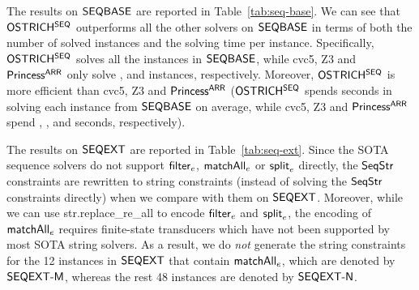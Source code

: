 The results on ${\sf SEQBASE}$ are reported in Table~\ref{tab:seq-base}.
We can see that ${\sf OSTRICH^{SEQ}}$ outperforms all the other solvers on ${\sf SEQBASE}$ in terms of both the number of solved instances and the solving time per instance. Specifically,   ${\sf OSTRICH^{SEQ}}$ solves all the  instances in ${\sf SEQBASE}$, while cvc5, Z3 and ${\sf Princess^{ARR}}$ only solve ,  and  instances, respectively. Moreover,  ${\sf OSTRICH^{SEQ}}$ is more efficient than cvc5, Z3 and ${\sf Princess^{ARR}}$ (${\sf OSTRICH^{SEQ}}$ spends  seconds in solving each instance from ${\sf SEQBASE}$ on average, while cvc5, Z3 and ${\sf Princess^{ARR}}$ spend , , and  seconds, respectively). 



The results on ${\sf SEQEXT}$ are reported in Table~\ref{tab:seq-ext}. Since the SOTA sequence solvers do not support ${\sf filter}_e$, $\mathsf{matchAll}_e$ or $\mathsf{split}_e$ directly, the ${\sf SeqStr}$ constraints are rewritten to string constraints (instead of solving the ${\sf SeqStr}$ constraints directly) when we compare with them on ${\sf SEQEXT}$.
Moreover, while we can use {\sf str.replace\_re\_all} to encode ${\sf filter}_e$ and $\mathsf{split}_e$, the encoding of $\mathsf{matchAll}_e$ requires finite-state transducers which have not been supported by most SOTA string solvers. %
As a result, we do \emph{not} generate the string constraints for the 12 instances in ${\sf SEQEXT}$ that contain $\mathsf{matchAll}_e$, which are denoted by 
${\sf SEQEXT}\mbox{\sf -M}$, whereas the rest 48 instances are %
denoted by ${\sf SEQEXT}\mbox{\sf -N}$. %


